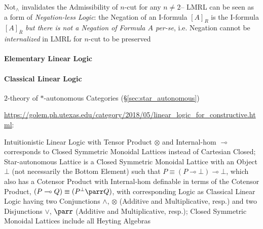 Not$_\wedge$ invalidates the Admissibility of $n$-cut for any $n \neq
2$-- LMRL can be seen as a form of \emph{Negation-less Logic}: the
Negation of an I-formula $[A]_R$ is the I-formula $[A]_{\overline{R}}$
\emph{but there is not a Negation of Formula $A$ per-se}, i.e.
Negation cannot be \emph{internalized} in LMRL for $n$-cut to be
preserved


\endgroup



\paragraph{Elementary Linear Logic}\label{sec:elementary_linear_logic}\hfill

\paragraph{Classical Linear Logic}\label{sec:classical_linear_logic}\hfill

$2$-theory of $*$-autonomous Categories (\S\ref{sec:star_autonomous})

\url{https://golem.ph.utexas.edu/category/2018/05/linear_logic_for_constructive.html}:

Intuitionistic Linear Logic with Tensor Product $\otimes$ and Internal-hom
$\multimap$ corresponds to Closed Symmetric Monoidal Lattices instead of
Cartesian Closed; Star-autonomous Lattice is a Closed Symmetric Monoidal
Lattice with an Object $\bot$ (not necessarily the Bottom Element) such that $P
\equiv (P \multimap \bot) \multimap \bot$, which also has a Cotensor Product
with Internal-hom definable in terms of the Cotensor Product, $(P \multimap Q)
\equiv (P^\bot \parr Q)$, with corresponding Logic as Classical Linear Logic
having two Conjunctions $\wedge$, $\otimes$ (Additive and Multiplicative,
resp.) and two Disjunctions $\vee$, $\parr$ (Additive and Multiplicative,
resp.); Closed Symmetric Monoidal Lattices include all Heyting Algebras

